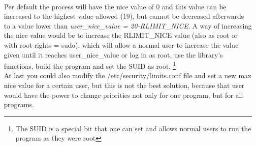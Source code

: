 \\
Per default the process will have
the nice value of 0 and this value can be increased to the highest value allowed (19), but cannot be
decreased afterwards to a value lower than \textit{user\_nice\_value = 20-RLIMIT\_NICE}. A way of
increasing the nice value would be to increase the RLIMIT\_NICE value (also as root or with root-rights = sudo), which will allow a normal user to increase the value given until it reaches
\dq user\_nice\_value\dq{} or log in as root, use the library's functions, build the program and set the SUID as root.
\footnote{The SUID is a special bit that one can set and allows normal users to run the program as they
were root}\\
At last you could also modify the \dq/etc/security/limits.conf\dq{} file and set a new max nice value for a
certain user, but this is not the best solution, because that user would have the power to change
priorities not only for one program, but for all programs.
